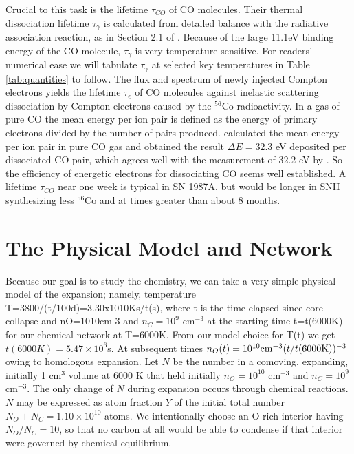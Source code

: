 \documentclass[manuscript]{aastex}
\begin{document}
Crucial to this task is the lifetime $\tau_{CO}$ of CO molecules. Their thermal
dissociation lifetime $\tau_\gamma$
is calculated from detailed balance with the
radiative association reaction, as in Section 2.1 of
\citet{2001ApJ...562..480C}.
Because of the large 11.1eV binding energy of the CO molecule,
$\tau_\gamma$ is very
temperature sensitive.  For readers' numerical ease we will tabulate
$\tau_\gamma$ at
selected key temperatures in Table \ref{tab:quantities} to follow.
The flux and spectrum of newly
injected Compton electrons \citep{1991ApJ...375..221C} yields the lifetime
$\tau_e$ of CO
molecules against inelastic scattering dissociation by Compton electrons
caused by the $^{56}$Co
radioactivity. In a gas of pure CO the mean energy per ion
pair is defined as the energy of primary electrons divided by the number of
pairs produced. \citet{1994ApJ...435..909L}
calculated the mean energy per ion pair
in pure CO gas and obtained the result $\Delta E = 32.3$ eV
deposited per dissociated CO
pair, which agrees well with the measurement of 32.2 eV by
\citet{1968...Klots}.
So the efficiency of energetic electrons for dissociating CO seems well
established. A lifetime $\tau_{CO}$ near one week is typical in SN 1987A, but
would be longer in SNII synthesizing less $^{56}$Co and at times greater than
about 8 months.

\section{The Physical Model and Network}

Because our goal is to study the chemistry, we can take a very simple physical
model of the expansion; namely, temperature T=3800/(t/100d)=3.30x1010Ks/t(s),
where t is the time elapsed since core collapse and nO=1010cm-3 and
$n_C = 10^9$ cm$^{-3}$
at the starting time t=t(6000K) for our chemical network at
T=6000K. From our model choice for T(t) we get
$t(6000K) = 5.47 \times 10^6$s. At
subsequent times $n_O(t) = 10^{10}{\rm cm}^{-3}(t/t(6000 {\rm K}))^{-3}$
owing to homologous expansion.
Let $N$ be the number in a comoving, expanding, initially 1 cm$^3$
volume at 6000 K
that held initially $n_O=10^{10}$ cm$^{-3}$ and $n_C = 10^9$ cm$^{-3}$.
The only change of $N$ during
expansion occurs through chemical reactions. $N$ may be expressed as atom
fraction $Y$ of the initial total number
$N_O + N_C = 1.10 \times 10^{10}$ atoms. We
intentionally choose an O-rich interior having $N_O/N_C = 10$,
so that no carbon at
all would be able to condense if that interior were governed by chemical
equilibrium. 
\end{document}
